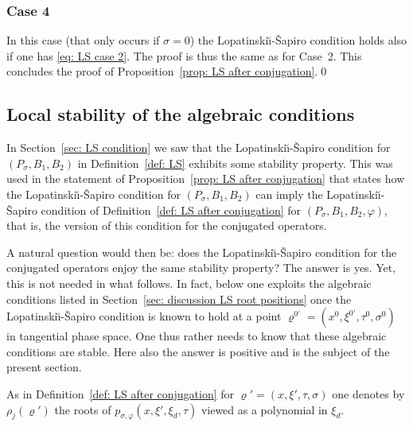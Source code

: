 \documentclass[JEP,XML,SOM,Unicode,published]{cedram}
\theoremstyle{plain}
\theoremstyle{definition}
\newcommand{\LS}{Lopatinski\u{\i}-\v{S}apiro\xspace}
\let\y\varrho
\newcommand{\Psig}{P_{\sigma}}
\newcommand{\pconj}{p_{\sigma,\varphi}}
\begin{document}
\subsubsection*{Case 4}
In this case (that only occurs if $\sigma=0$) the \LS condition
holds also if one has \eqref{eq: LS case 2}. The proof is thus
the same as for Case~2. This concludes the proof of
Proposition~\ref{prop: LS after conjugation}.\qed

\subsection{Local stability of the algebraic conditions}
\label{sec: Stability LS-conj}
In Section~\ref{sec: LS condition} we saw that the \LS condition for
$(\Psig, B_1, B_2)$ in Definition~\ref{def: LS} exhibits some stability
property. This was used in the statement of Proposition~\ref{prop: LS
after conjugation} that states how the \LS condition for
$(\Psig, B_1, B_2)$ can imply the \LS condition of
Definition~\ref{def: LS after conjugation} for
$(\Psig, B_1, B_2, \varphi)$, that is, the version of this condition
for the conjugated operators.

A natural question would then be: does the \LS condition for the
conjugated operators enjoy the same stability property? The answer is
yes. Yet, this is not needed in what follows. In fact, below one
exploits the algebraic conditions listed in Section~\ref{sec: discussion LS root positions} once the
\LS condition is known to hold at a point $\y^{0\prime} = (x^0,
\xi^{0\prime}, \tau^0, \sigma^0)$ in tangential
phase space. One thus rather needs to know that these algebraic
conditions are stable. Here also the answer is positive and is the
subject of the present section.

As in Definition~\ref{def: LS after conjugation} for $\y' =(x,\xi',\tau,\sigma)$ one denotes by
$\rho_j (\y')$
the roots of $\pconj(x,\xi',\xi_d, \tau)$ viewed as a polynomial in
$\xi_d$.
\end{document}
